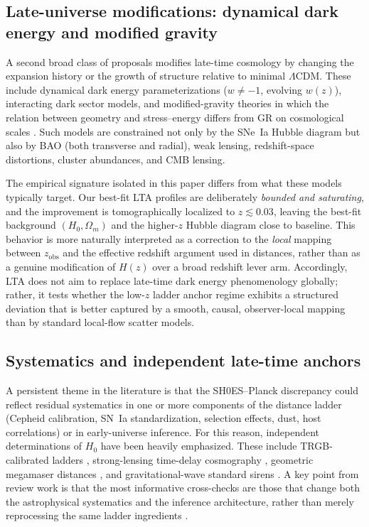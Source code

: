 \documentclass[10pt]{article}
\newcommand{\zobs}{z_{\mathrm{obs}}}
\begin{document}
\subsection{Late-universe modifications: dynamical dark energy and modified gravity}
A second broad class of proposals modifies late-time cosmology by changing the expansion history or
the growth of structure relative to minimal $\Lambda$CDM.
These include dynamical dark energy parameterizations ($w\neq -1$, evolving $w(z)$), interacting dark
sector models, and modified-gravity theories in which the relation between geometry and
stress--energy differs from GR on cosmological scales \cite{DiValentino2021Review,Verde2019Tensions}.
Such models are constrained not only by the SNe~Ia Hubble diagram but also by BAO (both transverse
and radial), weak lensing, redshift-space distortions, cluster abundances, and CMB lensing.

The empirical signature isolated in this paper differs from what these models typically target.
Our best-fit LTA profiles are deliberately \emph{bounded and saturating}, and the improvement is
tomographically localized to $z\lesssim 0.03$, leaving the best-fit background $(H_0,\Omega_m)$ and
the higher-$z$ Hubble diagram close to baseline.
This behavior is more naturally interpreted as a correction to the \emph{local} mapping between
$\zobs$ and the effective redshift argument used in distances, rather than as a genuine modification
of $H(z)$ over a broad redshift lever arm.
Accordingly, LTA does not aim to replace late-time dark energy phenomenology globally; rather, it
tests whether the low-$z$ ladder anchor regime exhibits a structured deviation that is better
captured by a smooth, causal, observer-local mapping than by standard local-flow scatter models.

\subsection{Systematics and independent late-time anchors}
A persistent theme in the literature is that the SH0ES--Planck discrepancy could reflect residual
systematics in one or more components of the distance ladder (Cepheid calibration, SN~Ia
standardization, selection effects, dust, host correlations) or in early-universe inference.
For this reason, independent determinations of $H_0$ have been heavily emphasized.
These include TRGB-calibrated ladders \cite{Freedman2019TRGB}, strong-lensing time-delay cosmography
\cite{Wong2019H0LiCOW,Birrer2020TDCOSMOIV}, geometric megamaser distances \cite{Pesce2020Megamaser},
and gravitational-wave standard sirens \cite{Abbott2017StandardSiren}.
A key point from review work is that the most informative cross-checks are those that change both
the astrophysical systematics and the inference architecture, rather than merely reprocessing the
same ladder ingredients \cite{DiValentino2021Review,Verde2019Tensions}.
\end{document}

